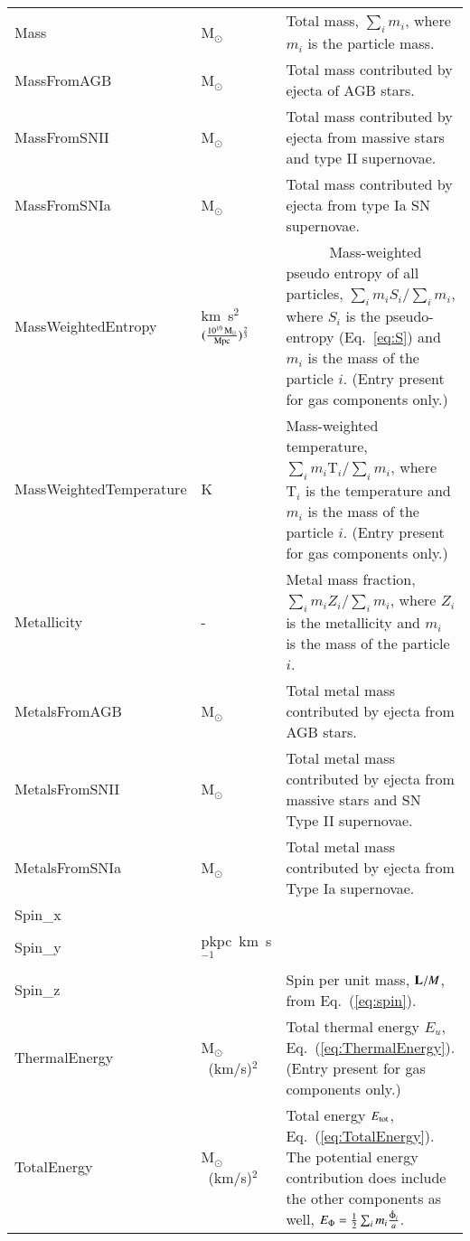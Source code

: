 \begin{table*}
\begin{center}
\begin{tabular}{ >{\ttfamily}p{4cm}p{1.5cm}p{11cm}}
Mass &
M$_{\odot}$ &
Total mass, $\sum_i m_i$, where $m_i$ is the particle mass.\\

MassFromAGB &
M$_{\odot}$ &
Total mass contributed by ejecta of AGB stars.\\

MassFromSNII &
M$_{\odot}$ & 
Total mass contributed by ejecta from massive stars and type II supernovae.\\

MassFromSNIa &
M$_{\odot}$ & 
Total mass contributed by ejecta from type Ia SN supernovae. \\

MassWeightedEntropy &
km~s$^{2}$~$(\frac{10^{10} \, \mathrm{M}_\odot}{\rm Mpc})^\frac{2}{3}$ &
~~~~~~Mass-weighted pseudo entropy of all particles, $\sum_i m_i S_i / \sum_i m_i$, where $S_{i}$ is the pseudo-entropy (Eq.~\ref{eq:S}) and $m_{i}$ is the mass of the particle $i$. (Entry present for gas components only.)\\

MassWeightedTemperature &
K &
Mass-weighted temperature, $\sum_i m_i \mathrm{T}_{i} / \sum_i m_{i}$, where $\mathrm{T}_{i}$ is the temperature and $m_{i}$ is the mass of the particle $i$. (Entry present for gas components only.)\\

Metallicity &
- & 
Metal mass fraction, $\sum_i m_i Z_i / \sum_i m_i$, where $Z_{i}$ is the metallicity and $m_{i}$ is the mass of the particle $i$. \\

MetalsFromAGB &
M$_\odot$ & 
Total metal mass contributed by ejecta from AGB stars. \\

MetalsFromSNII &
M$_\odot$ & 
Total metal mass contributed by ejecta from massive stars and SN Type II supernovae.\\

MetalsFromSNIa &
M$_\odot$ & 
Total metal mass contributed by ejecta from Type Ia supernovae.\\

Spin\_x & & \\
Spin\_y & pkpc~km~s$^{-1}$ &  \\
Spin\_z & & \multirow{-3}{11cm}{Spin per unit mass, ${\bf L}/M$, from Eq.~(\ref{eq:spin}).}\\

ThermalEnergy & 
M$_\odot$~(km/s)$^{2}$ &
Total thermal energy $E_u$, Eq.~(\ref{eq:ThermalEnergy}). (Entry present for gas components only.)\\

TotalEnergy & 
M$_\odot$~(km/s)$^{2}$ &
Total energy $E_{\rm tot}$, Eq.~(\ref{eq:TotalEnergy}). The potential energy contribution does include the other components as well, $E_{\Phi}={1\over 2}\sum_i m_i{\hat\Phi_i\over a}$.\\

\hline 

\end{tabular}
\end{center}
\end{table*}

